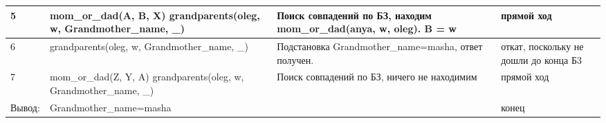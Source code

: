 \begin{table}
\begin{tabular}{|p{1cm}|p{5cm}|p{5cm}|p{5cm}|}
		\hline
		5 & mom\_or\_dad(A, B, X) \newline grandparents(oleg, w, Grandmother\_name, \_) & Поиск совпадений по БЗ, находим mom\_or\_dad(anya, w, oleg). B = w & прямой ход \\
		\hline
		6 & grandparents(oleg, w, Grandmother\_name, \_) & Подстановка Grandmother\_name=masha, ответ получен. & откат, поскольку не дошли до конца Б3 \\
		\hline
		7 & mom\_or\_dad(Z, Y, A) \newline grandparents(oleg, w, Grandmother\_name, \_) & Поиск совпадений по БЗ, ничего не находимим & прямой ход \\
		\hline
		Вывод: & Grandmother\_name=masha & & конец  \\
		\hline
	\end{tabular}
\end{table}
